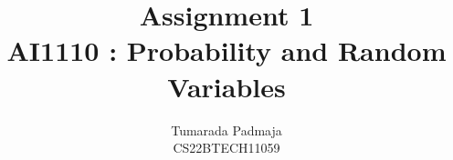 \documentclass[journal,12pt,onecolumn]{IEEEtran}
\DeclareMathOperator*{\Res}{Res}
\begin{document}
\newtheorem{problem}{Problem}
\newtheorem{definition}[problem]{Definition}
\newcommand{\BEQA}{\begin{eqnarray}}
\newcommand{\EEQA}{\end{eqnarray}}



\providecommand{\mbf}{\mathbf}
\providecommand{\pr}[1]{\ensuremath{\Pr\left(#1\right)}}
\providecommand{\qfunc}[1]{\ensuremath{Q\left(#1\right)}}
\providecommand{\sbrak}[1]{\ensuremath{{}\left[#1\right]}}
\providecommand{\lsbrak}[1]{\ensuremath{{}\left[#1\right.}}
\providecommand{\rsbrak}[1]{\ensuremath{{}\left.#1\right]}}
\providecommand{\brak}[1]{\ensuremath{\left(#1\right)}}
\providecommand{\lbrak}[1]{\ensuremath{\left(#1\right.}}
\providecommand{\rbrak}[1]{\ensuremath{\left.#1\right)}}
\providecommand{\cbrak}[1]{\ensuremath{\left\{#1\right\}}}
\providecommand{\lcbrak}[1]{\ensuremath{\left\{#1\right.}}
\providecommand{\rcbrak}[1]{\ensuremath{\left.#1\right\}}}

\theoremstyle{remark}
\newtheorem{rem}{Remark}


\newcommand{\sgn}{\mathop{\mathrm{sgn}}}
\providecommand{\abs}[1]{\left\vert#1\right\vert}
\providecommand{\res}[1]{\Res\displaylimits_{#1}} 
\providecommand{\norm}[1]{\left\lVert#1\right\rVert}
\providecommand{\mtx}[1]{\mathbf{#1}}
\providecommand{\mean}[1]{E\left[ #1 \right]}
\providecommand{\fourier}{\overset{\mathcal{F}}{ \rightleftharpoons}}
\providecommand{\system}{\overset{\mathcal{H}}{ \longleftrightarrow}}
\newcommand{\solution}{\noindent \textbf{Solution: }}
\newcommand{\cosec}{\,\text{cosec}\,}
\providecommand{\dec}[2]{\ensuremath{\overset{#1}{\underset{#2}{\gtrless}}}}
\newcommand{\myvec}[1]{\ensuremath{\begin{pmatrix}#1\end{pmatrix}}}
\newcommand{\mydet}[1]{\ensuremath{\begin{vmatrix}#1\end{vmatrix}}}

\let\vec\mathbf

\vspace{3cm}

\title{
Assignment 1\\AI1110 : Probability and Random Variables
}
\author{Tumarada Padmaja\\CS22BTECH11059}
\end{document}
